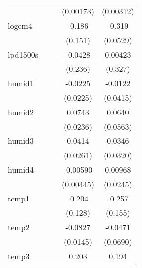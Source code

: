 {\begin{tabular}{l*{4}{c}}
            &                     &                     &   (0.00173)         &   (0.00312)         \\
[1em]
logem4      &                     &                     &      -0.186         &      -0.319\sym{***}\\
            &                     &                     &     (0.151)         &    (0.0529)         \\
[1em]
lpd1500s    &                     &                     &     -0.0428         &     0.00423         \\
            &                     &                     &     (0.236)         &     (0.327)         \\
[1em]
humid1      &                     &                     &     -0.0225         &     -0.0122         \\
            &                     &                     &    (0.0225)         &    (0.0415)         \\
[1em]
humid2      &                     &                     &      0.0743\sym{**} &      0.0640         \\
            &                     &                     &    (0.0236)         &    (0.0563)         \\
[1em]
humid3      &                     &                     &      0.0414         &      0.0346         \\
            &                     &                     &    (0.0261)         &    (0.0320)         \\
[1em]
humid4      &                     &                     &    -0.00590         &     0.00968         \\
            &                     &                     &   (0.00445)         &    (0.0245)         \\
[1em]
temp1       &                     &                     &      -0.204         &      -0.257         \\
            &                     &                     &     (0.128)         &     (0.155)         \\
[1em]
temp2       &                     &                     &     -0.0827\sym{***}&     -0.0471         \\
            &                     &                     &    (0.0145)         &    (0.0690)         \\
[1em]
temp3       &                     &                     &       0.203\sym{**} &       0.194\sym{**} \\

\end{tabular}}
